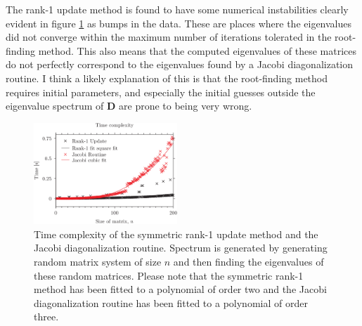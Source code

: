 \documentclass[twocolumn,a4paper, 10pts]{article}
\begin{document}
\par
The rank-1 update method is found to have some numerical instabilities clearly evident in figure \ref{fig:timing} as bumps in the data. These are places where the eigenvalues did not converge within the maximum number of iterations tolerated in the root-finding method. This also means that the computed eigenvalues of these matrices do not perfectly correspond to the eigenvalues found by a Jacobi diagonalization routine. I think a likely explanation of this is that the root-finding method requires initial parameters, and especially the initial guesses outside the eigenvalue spectrum of $\mathbf{D}$ are prone to being very wrong.
\begin{figure}[h]
    \includegraphics[width=0.48\textwidth]{img/timing.png}
    \caption{Time complexity of the symmetric rank-1 update method and the Jacobi diagonalization routine. Spectrum is generated by generating random matrix system of size $n$ and then finding the eigenvalues of these random matrices. Please note that the symmetric rank-1 method has been fitted to a polynomial of order two and the Jacobi diagonalization routine has been fitted to a polynomial of order three.}
    \label{fig:timing}
\end{figure}
\end{document}
